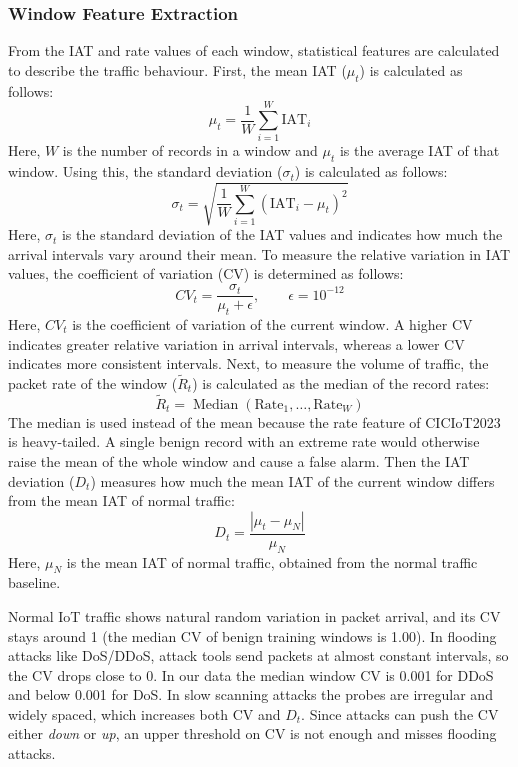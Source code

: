 \documentclass[]{interact}
\theoremstyle{plain}%
\theoremstyle{definition}
\theoremstyle{remark}
\begin{document}
\subsubsection{Window Feature Extraction}
From the IAT and rate values of each window, statistical features are calculated to describe the traffic behaviour. First, the mean IAT ($\mu_t$) is calculated as follows:
\begin{equation}
  \mu_t = \frac{1}{W}\sum_{i=1}^{W}\mathrm{IAT}_i
\end{equation}
Here, $W$ is the number of records in a window and $\mu_t$ is the average IAT of that window. Using this, the standard deviation ($\sigma_t$) is calculated as follows:
\begin{equation}
  \sigma_t = \sqrt{\frac{1}{W}\sum_{i=1}^{W}\left(\mathrm{IAT}_i-\mu_t\right)^2}
\end{equation}
Here, $\sigma_t$ is the standard deviation of the IAT values and indicates how much the arrival intervals vary around their mean. To measure the relative variation in IAT values, the coefficient of variation (CV) is determined as follows:
\begin{equation}
  CV_t = \frac{\sigma_t}{\mu_t + \epsilon}, \qquad \epsilon = 10^{-12}
\end{equation}
Here, $CV_t$ is the coefficient of variation of the current window. A higher CV indicates greater relative variation in arrival intervals, whereas a lower CV indicates more consistent intervals. Next, to measure the volume of traffic, the packet rate of the window ($\tilde{R}_t$) is calculated as the median of the record rates:
\begin{equation}
  \tilde{R}_t = \operatorname{Median}\left(\mathrm{Rate}_1, \ldots, \mathrm{Rate}_W\right)
\end{equation}
The median is used instead of the mean because the rate feature of CICIoT2023 is heavy-tailed. A single benign record with an extreme rate would otherwise raise the mean of the whole window and cause a false alarm. Then the IAT deviation ($D_t$) measures how much the mean IAT of the current window differs from the mean IAT of normal traffic:
\begin{equation}
  D_t = \frac{\left|\mu_t-\mu_{N}\right|}{\mu_{N}}
\end{equation}
Here, $\mu_N$ is the mean IAT of normal traffic, obtained from the normal traffic baseline.

Normal IoT traffic shows natural random variation in packet arrival, and its CV stays around 1 (the median CV of benign training windows is 1.00). In flooding attacks like DoS/DDoS, attack tools send packets at almost constant intervals, so the CV drops close to 0. In our data the median window CV is 0.001 for DDoS and below 0.001 for DoS. In slow scanning attacks the probes are irregular and widely spaced, which increases both CV and $D_t$. Since attacks can push the CV either \emph{down} or \emph{up}, an upper threshold on CV is not enough and misses flooding attacks.
\end{document}
